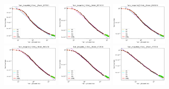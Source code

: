 \documentclass{article} %
\begin{document}
\begin{figure}
    \centering

\includegraphics[width=0.245\textwidth]{figures/scaling_laws_benchmark_dataset_plots__all_functional_forms/few_shot_5___BiT_50_1.png}
\includegraphics[width=0.245\textwidth]{figures/scaling_laws_benchmark_dataset_plots__all_functional_forms/few_shot_5___BiT_101_3.png}
\includegraphics[width=0.245\textwidth]{figures/scaling_laws_benchmark_dataset_plots__all_functional_forms/few_shot_5___MiX_B_16.png}
\includegraphics[width=0.245\textwidth]{figures/scaling_laws_benchmark_dataset_plots__all_functional_forms/few_shot_5___MiX_L_16.png}
\includegraphics[width=0.245\textwidth]{figures/scaling_laws_benchmark_dataset_plots__all_functional_forms/few_shot_5___ViT_B_16.png}
\includegraphics[width=0.245\textwidth]{figures/scaling_laws_benchmark_dataset_plots__all_functional_forms/few_shot_5___ViT_S_16.png}

\end{figure}
\end{document}

